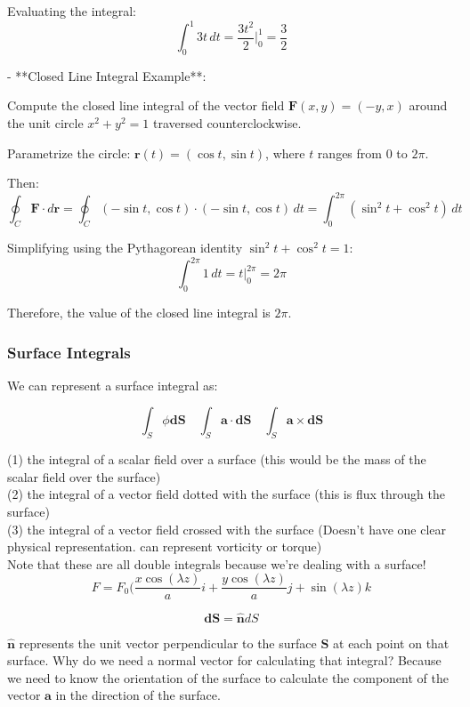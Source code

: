 \documentclass[12pt]{article}
\begin{document}
  Evaluating the integral:
  \[
  \int_0^1 3t \, dt = \frac{3t^2}{2} \Bigg|_0^1 = \frac{3}{2}
  \]

- **Closed Line Integral Example**:

  Compute the closed line integral of the vector field \(\mathbf{F}(x, y) = (-y, x)\) around the unit circle \( x^2 + y^2 = 1 \) traversed counterclockwise.

  Parametrize the circle: \(\mathbf{r}(t) = (\cos t, \sin t)\), where \( t \) ranges from 0 to \( 2\pi \).

  Then:
  \[
  \oint_C \mathbf{F} \cdot d\mathbf{r} = \oint_C (-\sin t, \cos t) \cdot (-\sin t, \cos t) \, dt = \int_0^{2\pi} (\sin^2 t + \cos^2 t) \, dt
  \]

  Simplifying using the Pythagorean identity \(\sin^2 t + \cos^2 t = 1\):
  \[
  \int_0^{2\pi} 1 \, dt = t \Bigg|_0^{2\pi} = 2\pi
  \]

Therefore, the value of the closed line integral is \( 2\pi \).

\subsubsection{Surface Integrals}

We can represent a surface integral as:

\[\int_S \phi \mathbf{dS} \quad \int_S \mathbf{a} \cdot \mathbf{dS} \quad \int_S \mathbf{a} \times \mathbf{dS}\]

(1) the integral of a scalar field over a surface (this would be the mass of the scalar field over the surface)\\
(2) the integral of a vector field dotted with the surface (this is flux through the surface)\\
(3) the integral of a vector field crossed with the surface (Doesn't have one clear physical representation. can represent vorticity or torque)\\

Note that these are all double integrals because we're dealing with a surface!\\


\[F = F_0(\frac{x\cos(\lambda z)}{a}i + \frac{y\cos(\lambda z)}{a}j + \sin(\lambda z)k \]

\[\mathbf{dS} = \mathbf{\hat{n}}dS\]

\(\mathbf{\hat{n}}\) represents the unit vector perpendicular to the surface \(\mathbf{S}\) at each point on that surface. Why do we need a normal vector for calculating that integral? Because we need to know the orientation of the surface to calculate the component of the vector \(\mathbf{a}\) in the direction of the surface.\\
\end{document}

